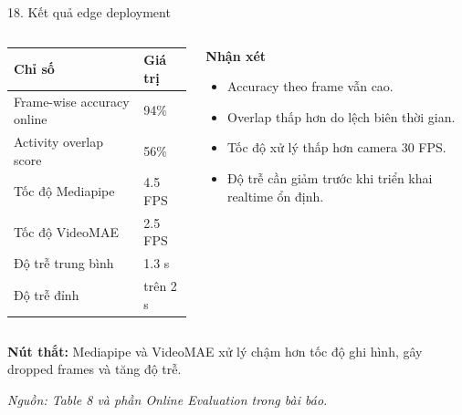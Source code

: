 \documentclass[aspectratio=169,9pt]{beamer}
\newcommand{\source}[1]{\vfill{\color{CoboGray}\fontsize{5.4}{6.4}\selectfont\itshape Nguồn: #1.\par}}
\newcommand{\smallnote}[1]{{\fontsize{7.1}{8.5}\selectfont #1\par}}
\newcommand{\heading}[1]{{\bfseries #1\par}}
\newcommand{\tightitems}{\setlength{\itemsep}{0.12em}\setlength{\parskip}{0pt}\setlength{\parsep}{0pt}}
\begin{document}
\begin{frame}{18. Kết quả edge deployment}
  \vspace{0.08cm}
  \begin{columns}[T,onlytextwidth]
    \begin{column}{0.56\textwidth}
      \centering
      {\fontsize{7.8}{9.4}\selectfont
      \renewcommand{\arraystretch}{1.28}
      \begin{tabular}{@{}L{3.68cm}R{1.55cm}@{}}
        \toprule
        \textbf{Chỉ số} & \textbf{Giá trị}\\
        \midrule
        Frame-wise accuracy online & 94\%\\
        Activity overlap score & 56\%\\
        Tốc độ Mediapipe & 4.5 FPS\\
        Tốc độ VideoMAE & 2.5 FPS\\
        Độ trễ trung bình & 1.3 s\\
        Độ trễ đỉnh & trên 2 s\\
        \bottomrule
      \end{tabular}}
    \end{column}
    \begin{column}{0.40\textwidth}
      \heading{Nhận xét}
      \begin{itemize}\tightitems
        \item Accuracy theo frame vẫn cao.
        \item Overlap thấp hơn do lệch biên thời gian.
        \item Tốc độ xử lý thấp hơn camera 30 FPS.
        \item Độ trễ cần giảm trước khi triển khai realtime ổn định.
      \end{itemize}
    \end{column}
  \end{columns}
  \vspace{0.20cm}
  \smallnote{\textbf{Nút thắt:} Mediapipe và VideoMAE xử lý chậm hơn tốc độ ghi hình, gây dropped frames và tăng độ trễ.}
  \source{Table 8 và phần Online Evaluation trong bài báo}
\end{frame}
\end{document}
